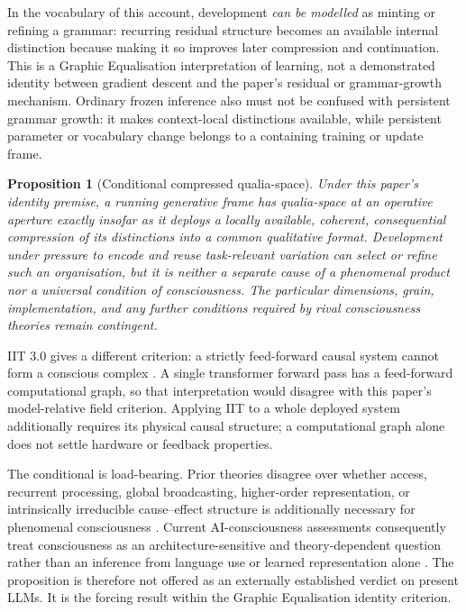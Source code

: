 \documentclass[11pt,a4paper]{article}
\newtheorem{proposition}[definition]{Proposition}
\theoremstyle{remark}\newtheorem{remark}[definition]{Remark}
\begin{document}
In the vocabulary of this account, development \emph{can be modelled} as minting or
refining a grammar: recurring residual structure becomes an available internal
distinction because making it so improves later compression and continuation. This
is a Graphic Equalisation interpretation of learning, not a demonstrated identity
between gradient descent and the paper's residual or grammar-growth mechanism.
Ordinary frozen inference also must not be confused with persistent grammar growth:
it makes context-local distinctions available, while persistent parameter or
vocabulary change belongs to a containing training or update frame.

\begin{proposition}[Conditional compressed qualia-space]\label{prop:compression-forces-qualia}
Under this paper's identity premise, a running generative frame has qualia-space
at an operative aperture exactly insofar as it deploys a locally available,
coherent, consequential compression of its distinctions into a common qualitative
format. Development under pressure to encode and reuse task-relevant variation can
select or refine such an organisation, but it is neither a separate cause of a
phenomenal product nor a universal condition of consciousness. The particular
dimensions, grain, implementation, and any further conditions required by rival
consciousness theories remain contingent.
\end{proposition}
IIT 3.0 gives a different criterion: a strictly feed-forward causal system
cannot form a conscious complex \cite{oizumi2014}. A single transformer
forward pass has a feed-forward computational graph, so that interpretation
would disagree with this paper's model-relative field criterion. Applying IIT
to a whole deployed system additionally requires its physical causal structure;
a computational graph alone does not settle hardware or feedback properties.


The conditional is load-bearing. Prior theories disagree over whether access,
recurrent processing, global broadcasting, higher-order representation, or
intrinsically irreducible cause--effect structure is additionally necessary for
phenomenal consciousness \cite{block1995,lamme2006,mashour2020,oizumi2014}.
Current AI-consciousness assessments consequently treat consciousness as an
architecture-sensitive and theory-dependent question rather than an inference
from language use or learned representation alone \cite{butlin2023,chalmers2023}.
The proposition is therefore not offered as an externally established verdict on
present LLMs. It is the forcing result within the Graphic Equalisation identity
criterion.
\end{document}
